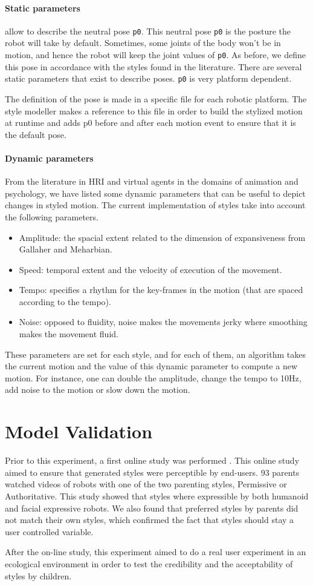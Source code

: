\paragraph{Static parameters} allow to describe the neutral pose \texttt{p0}. 
This neutral pose \texttt{p0} is the posture the robot will take by default.
Sometimes, some joints of the body won't be in motion,  and hence the robot will keep the joint values of \texttt{p0}.
As before, we define this pose in accordance with the styles found in the literature. 
There are several static parameters that exist to describe poses. 
\texttt{p0} is very platform dependent. 

The definition of the pose is made in a specific file for each robotic platform. 
The style modeller makes a reference to this file in order to build the stylized motion at runtime and adds p0 before and after each motion event to ensure that it is the default pose.




\paragraph{Dynamic parameters}
From the literature in HRI and virtual agents in the domains of animation and psychology, we have listed some dynamic parameters that can be useful to depict changes in styled motion.
The current implementation of styles take into account the following parameters. 
\begin{itemize}[noitemsep,nolistsep]
	\item Amplitude: the spacial extent related to the dimension of expansiveness from Gallaher and Meharbian.
	\item Speed: temporal extent and the velocity of execution of the movement.
	\item Tempo: specifies a rhythm for the key-frames in the motion (that are spaced according to the tempo).
	\item Noise: opposed to fluidity, noise makes the movements jerky where smoothing makes the movement fluid.
\end{itemize}
These parameters are set for each style, and for each of them, an algorithm takes the current motion and the value of this dynamic parameter to compute a new motion.
For instance, one can double the amplitude, change the tempo to 10Hz, add noise to the motion or slow down the motion.

\section{Model Validation}
Prior to this experiment, a first online study was performed \cite{Johal2014}. 
This online study aimed to ensure that generated styles were perceptible by end-users. 
93 parents watched videos of robots with one of the two parenting styles, Permissive or Authoritative. 
This study showed that styles where expressible by both humanoid and facial expressive robots. 
We also found that preferred styles by parents did not match their own styles, which confirmed the fact that styles should stay a user controlled variable. 

After the on-line study, this experiment aimed to do a real user experiment in an ecological environment in order to test the credibility and the acceptability of styles by children. 